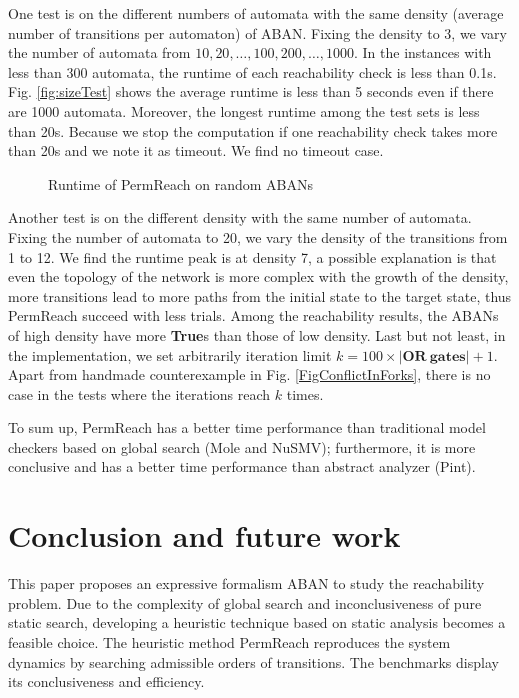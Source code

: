 \documentclass[runningheads]{llncs}
\begin{document}
One test is on the different numbers of automata with the same density (average number of transitions per automaton) of ABAN. Fixing the density to 3, we vary the number of automata from $10,20,\ldots,100,200,\ldots,1000$.
In the instances with less than 300 automata, the runtime of each reachability check is less than 0.1s.
Fig. \ref{fig:sizeTest} shows the average runtime is less than 5 seconds even if there are 1000 automata. 
Moreover, the longest runtime among the test sets is less than 20s. 
Because we stop the computation if one reachability check takes more than 20s and we note it as timeout.
We find no timeout case.
\begin{figure}[ht]
    \caption{Runtime of PermReach on random ABANs}
\end{figure}
Another test is on the different density with the same number of automata. 
Fixing the number of automata to 20, we vary the density of the transitions from 1 to 12.
We find the runtime peak is at density 7, a possible explanation is that even the topology of the network is more complex with the growth of the density, more transitions lead to more paths from the initial state to the target state, thus PermReach succeed with less trials.
Among the reachability results, the ABANs of high density have more \textbf{True}s than those of low density.
Last but not least, in the implementation, we set arbitrarily iteration limit $k=100\times|\mathbf{OR\  gates}|+1$. 
Apart from handmade counterexample in Fig. \ref{FigConflictInForks}, there is no case in the tests where the iterations reach $k$ times.


To sum up, PermReach has a better time performance than traditional model checkers based on global search (Mole and NuSMV); furthermore, it is more conclusive and has a better time performance than abstract analyzer (Pint).

\section{Conclusion and future work}\label{sect:6}
This paper proposes an expressive formalism ABAN to study the reachability problem. 
Due to the complexity of global search and inconclusiveness of pure static search, developing a heuristic technique based on static analysis becomes a feasible choice.
The heuristic method PermReach reproduces the system dynamics by searching admissible orders of transitions.
The benchmarks display its conclusiveness and efficiency.
\end{document}
